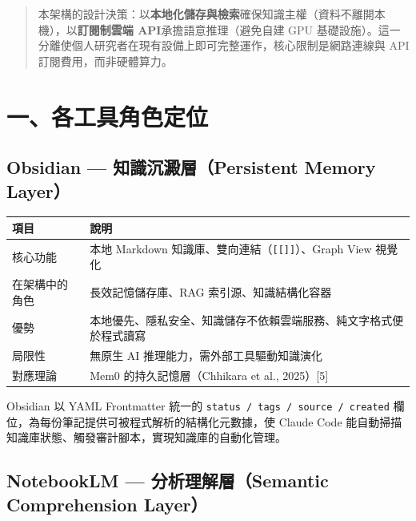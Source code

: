 \begin{quote}
本架構的設計決策：以\textbf{本地化儲存與檢索}確保知識主權（資料不離開本機），以\textbf{訂閱制雲端
API}承擔語意推理（避免自建 GPU
基礎設施）。這一分離使個人研究者在現有設備上即可完整運作，核心限制是網路連線與
API 訂閱費用，而非硬體算力。
\end{quote}

\section{一、各工具角色定位}\label{ux4e00ux5404ux5de5ux5177ux89d2ux8272ux5b9aux4f4d}

\subsection{Obsidian --- 知識沉澱層（Persistent Memory
Layer）}\label{obsidian-ux77e5ux8b58ux6c89ux6fb1ux5c64persistent-memory-layer}

{\def\LTcaptype{none} %
\begin{longtable}[]{@{}
  >{\raggedright\arraybackslash}p{}
  >{\raggedright\arraybackslash}p{}@{}}
\toprule\noalign{}
\begin{minipage}[b]{\linewidth}\raggedright
項目
\end{minipage} & \begin{minipage}[b]{\linewidth}\raggedright
說明
\end{minipage} \\
\midrule\noalign{}
\endhead
\bottomrule\noalign{}
\endlastfoot
核心功能 & 本地 Markdown
知識庫、雙向連結（\texttt{{[}{[}{]}{]}}）、Graph View 視覺化 \\
在架構中的角色 & 長效記憶儲存庫、RAG 索引源、知識結構化容器 \\
優勢 &
本地優先、隱私安全、知識儲存不依賴雲端服務、純文字格式便於程式讀寫 \\
局限性 & 無原生 AI 推理能力，需外部工具驅動知識演化 \\
對應理論 & Mem0 的持久記憶層（Chhikara et al., 2025）{[}5{]} \\
\end{longtable}
}

Obsidian 以 YAML Frontmatter 統一的
\texttt{status\ /\ tags\ /\ source\ /\ created}
欄位，為每份筆記提供可被程式解析的結構化元數據，使 Claude Code
能自動掃描知識庫狀態、觸發審計腳本，實現知識庫的自動化管理。

\subsection{NotebookLM --- 分析理解層（Semantic Comprehension
Layer）}\label{notebooklm-ux5206ux6790ux7406ux89e3ux5c64semantic-comprehension-layer}

